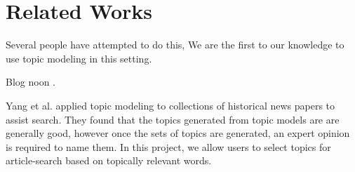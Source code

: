 \section{Related Works}

Several people have attempted to do this,
We are the first to our knowledge to use topic modeling in this setting.

Blog noon \cite{Grineva:2011:BET:1963192.1963292}.


Yang et al. \cite{yang2011topic} applied topic modeling to 
collections of historical news papers to assist search. They 
found that the topics generated from topic models are 
are generally good, however once the sets of topics are 
generated, an expert opinion is required to name them. 
In this project, we allow users to select topics for article-search 
based on topically relevant words.     


